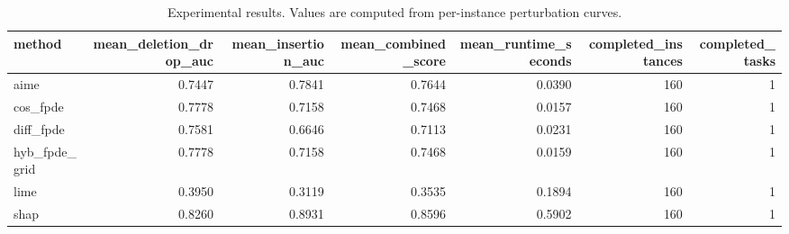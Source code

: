 \begin{table}[t]
\caption{Experimental results. Values are computed from per-instance perturbation curves.}
\label{tab:main_results_computed}
\centering
\begin{tabular}{lrrrrrr}
\toprule
method & mean\_deletion\_drop\_auc & mean\_insertion\_auc & mean\_combined\_score & mean\_runtime\_seconds & completed\_instances & completed\_tasks \\
\midrule
aime & 0.7447 & 0.7841 & 0.7644 & 0.0390 & 160 & 1 \\
cos\_fpde & 0.7778 & 0.7158 & 0.7468 & 0.0157 & 160 & 1 \\
diff\_fpde & 0.7581 & 0.6646 & 0.7113 & 0.0231 & 160 & 1 \\
hyb\_fpde\_grid & 0.7778 & 0.7158 & 0.7468 & 0.0159 & 160 & 1 \\
lime & 0.3950 & 0.3119 & 0.3535 & 0.1894 & 160 & 1 \\
shap & 0.8260 & 0.8931 & 0.8596 & 0.5902 & 160 & 1 \\
\bottomrule
\end{tabular}

\end{table}
